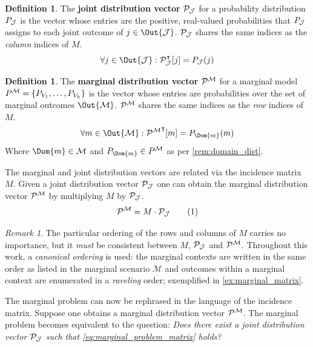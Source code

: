 \documentclass[aps, 10pt, english, twoside, pra, nofootinbib, longbibliography]{revtex4-1}
\theoremstyle{plain}
\theoremstyle{definition}
\newtheorem{definition}[theorem]{Definition}
\theoremstyle{remark}
\newtheorem{remark}[theorem]{Remark}
\newcommand{\mscenario}{\mathcal{M}}
\newcommand{\jointvar}{\mathcal{J}}
\newcommand{\term}[1]{\textcolor{Mahogany}{\textbf{#1}}}
\begin{document}
    \begin{definition}
        The \term{joint distribution vector} $\probvec[\jointvar]$ for a probability distribution $\prob[\jointvar]$ is the vector whose entries are the positive, real-valued probabilities that $\prob[\jointvar]$ assigns to each joint outcome of $j \in \Out{\jointvar}$. $\probvec[\jointvar]$ shares the same indices as the \textit{column} indices of $M$.
        \[ \forall j \in \Out{\jointvar} : \probvec[\jointvar]^\intercal\bs{j} = \prob[\jointvar][j] \]
    \end{definition}
    \begin{definition}
        The \term{marginal distribution vector} $\probvec^{\mscenario}$ for a marginal model $\prob^{\mscenario} = \bc{P_{V_1}, \ldots, P_{V_k}}$ is the vector whose entries are probabilities over the set of marginal outcomes $\Out{\mscenario}$. $\probvec^{\mscenario}$ shares the same indices as the \textit{row} indices of $M$.
        \[ \forall m \in \Out{\mscenario} : {\probvec^{\mscenario}}^\intercal\bs{m} = \prob[\Dom{m}][m] \]
        Where $\Dom{m} \in \mscenario$ and $\prob[\Dom{m}] \in \prob^{\mscenario}$ as per \cref{rem:domain_dist}.
    \end{definition}
    The marginal and joint distribution vectors are related via the incidence matrix $M$. Given a joint distribution vector $\probvec[\jointvar]$ one can obtain the marginal distribution vector $\probvec^{\mscenario}$ by multiplying $M$ by $\probvec[\jointvar]$.
    \[ \probvec^{\mscenario} = M \cdot \probvec[\jointvar] \eq \label{eq:marginal_problem_matrix} \]

    \begin{remark}
        The particular ordering of the rows and columns of $M$ carries no importance, but it \textit{must} be consistent between $M$, $\probvec[\jointvar]$ and $\probvec^{\mscenario}$. Throughout this work, a \textit{canonical ordering} is used: the marginal contexts are written in the same order as listed in the marginal scenario $\mscenario$ and outcomes within a marginal context are enumerated in a \textit{raveling} order; exemplified in \cref{ex:marginal_matrix}.
    \end{remark}

    The marginal problem can now be rephrased in the language of the incidence matrix. Suppose one obtains a marginal distribution vector $\probvec^{\mscenario}$. The marginal problem becomes equivalent to the question: \textit{Does there exist a joint distribution vector $\probvec[\jointvar]$ such that \cref{eq:marginal_problem_matrix} holds?}
\end{document}
